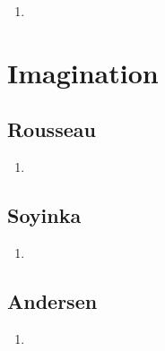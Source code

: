 \documentclass[a4paper, 11pt, hidelinks]{article}
\begin{document}
\begin{enumerate}
    \item 
\end{enumerate}




































\section{Imagination}



\subsection{Rousseau}


\begin{enumerate}
    \item 
\end{enumerate}



\subsection{Soyinka}


\begin{enumerate}
    \item 
\end{enumerate}




\subsection{Andersen}


\begin{enumerate}
    \item 
\end{enumerate}
\end{document}
